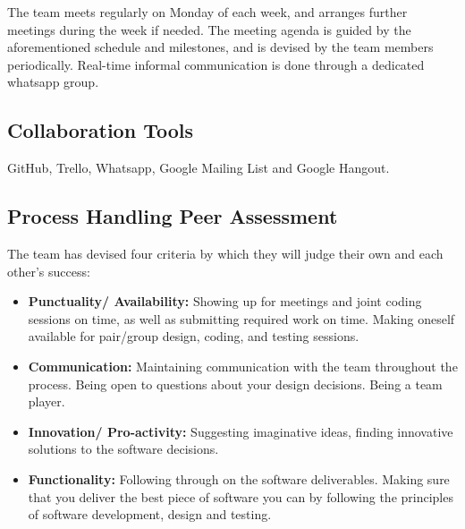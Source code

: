 \documentclass[11pt]{article}
\begin{document}
The team meets regularly on Monday of each week, and arranges further meetings during the week if needed. The meeting agenda is guided by the aforementioned schedule and milestones, and is devised by the team members periodically. Real-time informal communication is done through a dedicated whatsapp group.

\subsection{Collaboration Tools}

GitHub, Trello, Whatsapp, Google Mailing List and Google Hangout.

\subsection{Process Handling Peer Assessment}
The team has devised four criteria by which they will judge their own
and each other's success:
\begin{itemize}
	\item \textbf{Punctuality/ Availability:}
	Showing up for meetings and joint coding sessions on time, as well as submitting required work on time.
	Making oneself available for pair/group design, coding, and testing sessions.
	
	\item \textbf{Communication:}
	 Maintaining communication with the team throughout the process. Being open to questions about your design decisions. Being a team player.
	
	\item \textbf{Innovation/ Pro-activity:}
	 Suggesting imaginative ideas, finding innovative solutions to the software decisions.
	
	\item \textbf{Functionality:}
	 Following through on the software deliverables. Making sure that you deliver the best piece of software you can by following the principles of software development, design and testing.
\end{itemize}
\end{document}
